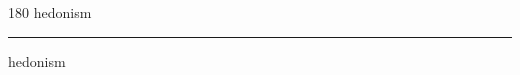 
\begin{frame}
\begin{center}
\begin{turn}{180}
{\fontsize{2.5cm}{1em}\selectfont hedonism}
\end{turn}
\vspace{1em}\par  
\hrule
\vspace{1em}\par  
{\fontsize{2.5cm}{1em}\selectfont hedonism}
\end{center}
\end{frame}

